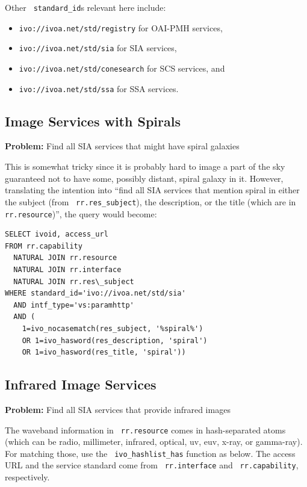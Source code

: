 \documentclass[11pt,a4paper]{ivoa}
\newcommand{\rtent}[1]{\texttt{\color{rtcolor} #1}}
\begin{document}
Other \rtent{standard\_id}s relevant here include:


\begin{itemize}

\item \texttt{ivo://ivoa.net/std/registry} for OAI-PMH services,{}

\item \texttt{ivo://ivoa.net/std/sia} for SIA services,{}

\item \texttt{ivo://ivoa.net/std/conesearch} for SCS services,
and{}

\item \texttt{ivo://ivoa.net/std/ssa} for SSA services.{}

\end{itemize}

\subsection{Image Services with Spirals}

\textbf{Problem:} Find all SIA services that might have spiral
galaxies

This is somewhat tricky since it is probably hard to image a part
of the sky guaranteed not to have some, possibly distant, spiral galaxy
in it.  However, translating the intention into ``find all SIA services
that mention spiral in either the subject (from 
\rtent{rr.res\_subject}), the description, or the
title (which are in 
\rtent{rr.resource})'', 
the query would become:


\begin{verbatim}
SELECT ivoid, access_url 
FROM rr.capability 
  NATURAL JOIN rr.resource
  NATURAL JOIN rr.interface
  NATURAL JOIN rr.res\_subject
WHERE standard_id='ivo://ivoa.net/std/sia'
  AND intf_type='vs:paramhttp'
  AND (
    1=ivo_nocasematch(res_subject, '%spiral%')
    OR 1=ivo_hasword(res_description, 'spiral')
    OR 1=ivo_hasword(res_title, 'spiral'))
\end{verbatim}


\subsection{Infrared Image Services}

\textbf{Problem:} Find all SIA services that provide infrared
images

The waveband information in 
\rtent{rr.resource} 
comes in hash-separated atoms (which can be
radio, millimeter, infrared, optical, uv, euv, x-ray, or gamma-ray).
For matching those, use the \rtent{ivo\_hashlist\_has} function as
below.  The access URL and the service standard come from 
\rtent{rr.interface} and 
\rtent{rr.capability}, respectively.
\end{document}
